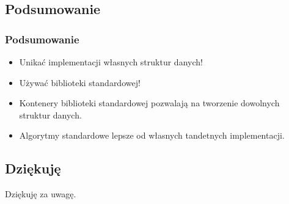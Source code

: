 \documentclass[compress]{beamer}
\begin{document}
\subsection{Podsumowanie}

\begin{frame}

  \frametitle{Podsumowanie}

  \begin{itemize}
    \item Unikać implementacji własnych struktur danych!
    \item Używać biblioteki standardowej!
    \item Kontenery biblioteki standardowej pozwalają na tworzenie
      dowolnych struktur danych.
    \item Algorytmy standardowe lepsze od własnych tandetnych
      implementacji.
  \end{itemize}

\end{frame}


\subsection{Dziękuję}

\begin{frame}[plain]

  \begin{center}
    \huge Dziękuję za uwagę.
  \end{center}

\end{frame}
\end{document}

